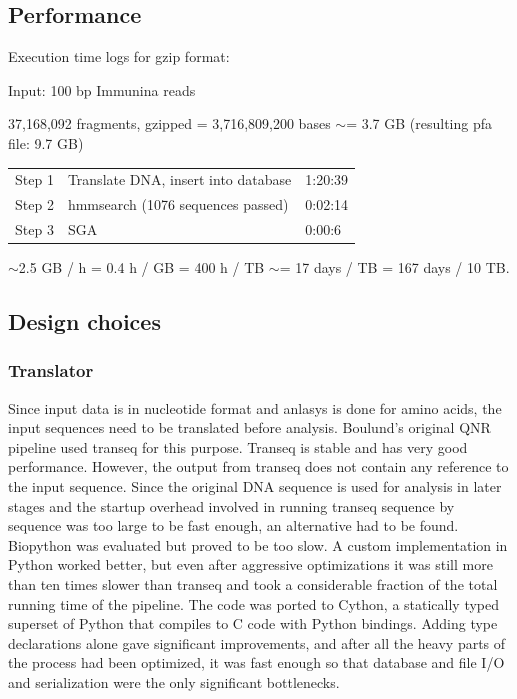 \documentclass[a4paper,12pt]{article}
\begin{document}
\subsection{Performance}
Execution time logs for gzip format:

Input: 100 bp Immunina reads

37,168,092 fragments, gzipped = 3,716,809,200 bases $\sim$= 3.7 GB (resulting pfa file: 9.7 GB)

\begin{tabular}{lll}
Step 1&Translate DNA, insert into database&1:20:39\\
Step 2&hmmsearch (1076 sequences passed)&0:02:14\\
Step 3&SGA&0:00:6
\end{tabular}


$\sim$2.5 GB / h = 0.4 h / GB = 400 h / TB $\sim$= 17 days / TB = 167 days / 10 TB.


 
\subsection{Design choices}
\subsubsection{Translator}
Since input data is in nucleotide format and anlasys is done for amino acids, the input sequences need to be translated before analysis. Boulund's original QNR pipeline used transeq for this purpose. Transeq is stable and has very good performance. However, the output from transeq does not contain any reference to the input sequence. Since the original DNA sequence is used for analysis in later stages and the startup overhead involved in running transeq sequence by sequence was too large to be fast enough, an alternative had to be found. Biopython was evaluated but proved to be too slow. A custom implementation in Python worked better, but even after aggressive optimizations it was still more than ten times slower than transeq and took a considerable fraction of the total running time of the pipeline. The code was ported to Cython, a statically typed superset of Python that compiles to C code with Python bindings. Adding type declarations alone gave significant improvements, and after all the heavy parts of the process had been optimized, it was fast enough so that database and file I/O and serialization were the only significant bottlenecks.
\end{document}
